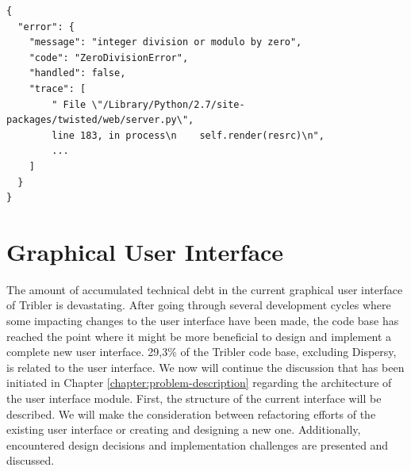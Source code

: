\begin{lstlisting}[caption={The response in JSON format returned when a Python exception is observed during the processing of an API request.},label={lst:error-api-json}]
{
  "error": {
    "message": "integer division or modulo by zero",
    "code": "ZeroDivisionError",
    "handled": false,
    "trace": [
        " File \"/Library/Python/2.7/site-packages/twisted/web/server.py\", 
        line 183, in process\n    self.render(resrc)\n", 
        ...
    ]
  }
}
\end{lstlisting}

\section{Graphical User Interface}
The amount of accumulated technical debt in the current graphical user interface of Tribler is devastating. After going through several development cycles where some impacting changes to the user interface have been made, the code base has reached the point where it might be more beneficial to design and implement a complete new user interface. 29,3\% of the Tribler code base, excluding Dispersy, is related to the user interface. We now will continue the discussion that has been initiated in Chapter \ref{chapter:problem-description} regarding the architecture of the user interface module. First, the structure of the current interface will be described. We will make the consideration between refactoring efforts of the existing user interface or creating and designing a new one. Additionally, encountered design decisions and implementation challenges are presented and discussed.

